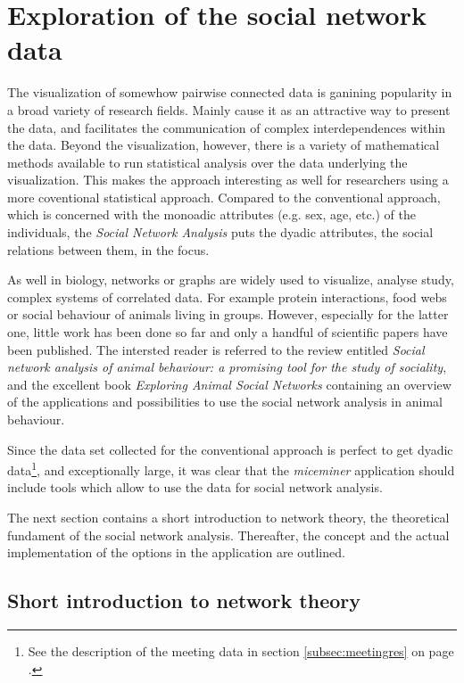 \section{Exploration of the social network data}
\label{sec:graph}

The visualization of somewhow pairwise connected data is ganining popularity in a broad variety of research fields. Mainly cause it as an attractive way to present the data, and facilitates the communication of complex interdependences within the data. Beyond the visualization, however, there is a variety of mathematical methods available to run statistical analysis over the data underlying the visualization. This makes the approach interesting as well for researchers using a more coventional statistical approach. Compared to the conventional approach, which is concerned with the monoadic attributes (e.g. sex, age, etc.) of the individuals, the \textit{Social Network Analysis} puts the dyadic attributes, the social relations between them, in the focus.

As well in biology, networks or graphs are widely used to visualize, analyse study, complex systems of correlated data. For example protein interactions, food webs or social behaviour of animals living in groups. However, especially for the latter one, little work has been done so far and only a handful of scientific papers have been published. The intersted reader is referred to the review entitled \textit{Social network analysis of animal behaviour: a promising 
tool for the study of sociality}\cite{wey:08}, and the excellent book \textit{Exploring Animal Social Networks}\cite{croft:07} containing an overview of the applications and possibilities to use the social network analysis in animal behaviour.

Since the data set collected for the conventional approach is perfect to get dyadic data\footnote{See the description of the meeting data in section \ref{subsec:meetingres} on page \pageref{subsec:meetingres}.}, and exceptionally large, it was clear that the \textit{miceminer} application should include tools which allow to use the data for social network analysis.

The next section contains a short introduction to network theory, the theoretical fundament of the social network analysis. Thereafter, the concept and the actual implementation of the options in the application are outlined.  

\subsection{Short introduction to network theory}
\label{subsec:graph_intro}


